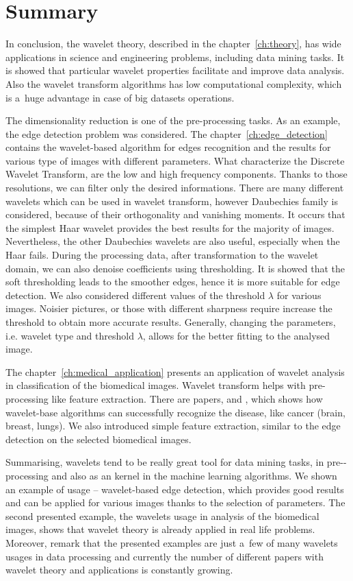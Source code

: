 \chapter*{Summary}

In conclusion, the wavelet theory, described in the chapter~\ref{ch:theory}, has wide applications in science and engineering problems, including data mining tasks. It is showed that particular wavelet properties facilitate and improve data analysis. Also the wavelet transform algorithms has low computational complexity, which is a~huge advantage in case of big datasets operations.

The dimensionality reduction is one of the pre-processing tasks. As an example, the edge detection problem was considered. The chapter~\ref{ch:edge_detection} contains the wavelet-based algorithm for edges recognition and the results for various type of images with different parameters. 
What characterize the Discrete Wavelet Transform, are the low and high frequency components. Thanks to those resolutions, we can filter only the desired informations. There are many different wavelets which can be used in wavelet transform, however Daubechies family is considered, because of their orthogonality and vanishing moments. It occurs that the simplest Haar wavelet provides the best results for the majority of images. Nevertheless, the other Daubechies wavelets are also useful, especially when the Haar fails. During the processing data, after transformation to the wavelet domain, we can also denoise coefficients using thresholding. It is showed that the soft thresholding leads to the smoother edges, hence it is more suitable for edge detection. We also considered different values of the threshold $\lambda$ for various images. Noisier pictures, or those with different sharpness require increase the threshold to obtain more accurate results.
Generally, changing the parameters, i.e. wavelet type and threshold $\lambda$, allows for the better fitting to the analysed image.

The chapter~\ref{ch:medical_application} presents an application of wavelet analysis in classification of the biomedical images. Wavelet transform helps with pre-processing like feature extraction. There are papers, \cite{MRI} and \cite{BiomedicalImages}, which shows how wavelet-base algorithms can successfully recognize the disease, like cancer (brain, breast, lungs). We also introduced simple feature extraction, similar to the edge detection on the selected biomedical images.

Summarising, wavelets tend to be really great tool for data mining tasks, in pre-\allowbreak-processing and also as an kernel in the machine learning algorithms. We shown an example of usage -- wavelet-based edge detection, which provides good results and can be applied for various images thanks to the selection of parameters.
The second presented example, the wavelets usage in analysis of the biomedical images, shows that wavelet theory is already applied in real life problems. Moreover, remark that the presented examples are just a~few of many wavelets usages in data processing and currently the number of different papers with wavelet theory and applications is constantly growing.